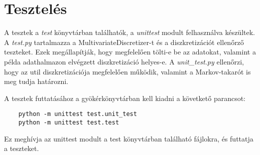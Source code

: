 \section{Tesztelés}
A tesztek a \emph{test} könyvtárban találhatók, a \emph{unittest} modult felhasználva készültek. A \emph{test.py} tartalmazza a MultivariateDiscretizer-t és a diszkretizációt ellenőrző teszteket. Ezek megállapítják, hogy megfelelően tölti-e be az adatokat, valamint a példa adathalmazon elvégzett diszkretizáció helyes-e. A \emph{unit\_test.py} ellenőrzi, hogy az util diszkretizációja megfelelően működik, valamint a Markov-takarót is meg tudja határozni.

A tesztek futtatásához a gyökérkönyvtárban kell kiadni a követkető parancsot:

\begin{lstlisting}
    python -m unittest test.unit_test
    python -m unittest test.test
\end{lstlisting}

Ez meghívja az unittest modult a test könyvtárban található fájlokra, és futtatja a teszteket.